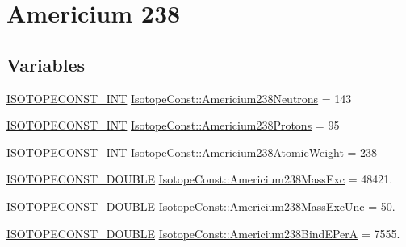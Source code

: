 \hypertarget{group___isotope_const-_americium-_am238}{}\section{Americium 238}
\label{group___isotope_const-_americium-_am238}
\subsection*{Variables}
\begin{DoxyCompactItemize}
\item 
\mbox{\hyperlink{group___isotope_const-_macros_ga5f18360b3e99483a35c32d789e62621c}{I\+S\+O\+T\+O\+P\+E\+C\+O\+N\+S\+T\+\_\+\+I\+NT}} \mbox{\hyperlink{group___isotope_const-_americium-_am238_gaca530676eab99aee4e47d8e9b5197b26}{Isotope\+Const\+::\+Americium238\+Neutrons}} = 143
\item 
\mbox{\hyperlink{group___isotope_const-_macros_ga5f18360b3e99483a35c32d789e62621c}{I\+S\+O\+T\+O\+P\+E\+C\+O\+N\+S\+T\+\_\+\+I\+NT}} \mbox{\hyperlink{group___isotope_const-_americium-_am238_ga6bbe7a3de3ba2c63cc3b370e14323937}{Isotope\+Const\+::\+Americium238\+Protons}} = 95
\item 
\mbox{\hyperlink{group___isotope_const-_macros_ga5f18360b3e99483a35c32d789e62621c}{I\+S\+O\+T\+O\+P\+E\+C\+O\+N\+S\+T\+\_\+\+I\+NT}} \mbox{\hyperlink{group___isotope_const-_americium-_am238_gaab8fb5bebdc0a9f78f2ca303e73b6611}{Isotope\+Const\+::\+Americium238\+Atomic\+Weight}} = 238
\item 
\mbox{\hyperlink{group___isotope_const-_macros_ga8f45a7272ce02c0b4c65c44636ed719a}{I\+S\+O\+T\+O\+P\+E\+C\+O\+N\+S\+T\+\_\+\+D\+O\+U\+B\+LE}} \mbox{\hyperlink{group___isotope_const-_americium-_am238_ga63723c4fe666709ea28e31e04482a9e4}{Isotope\+Const\+::\+Americium238\+Mass\+Exc}} = 48421.
\item 
\mbox{\hyperlink{group___isotope_const-_macros_ga8f45a7272ce02c0b4c65c44636ed719a}{I\+S\+O\+T\+O\+P\+E\+C\+O\+N\+S\+T\+\_\+\+D\+O\+U\+B\+LE}} \mbox{\hyperlink{group___isotope_const-_americium-_am238_gafe53cd3d992824c4e73017e701cb3ac7}{Isotope\+Const\+::\+Americium238\+Mass\+Exc\+Unc}} = 50.
\item 
\mbox{\hyperlink{group___isotope_const-_macros_ga8f45a7272ce02c0b4c65c44636ed719a}{I\+S\+O\+T\+O\+P\+E\+C\+O\+N\+S\+T\+\_\+\+D\+O\+U\+B\+LE}} \mbox{\hyperlink{group___isotope_const-_americium-_am238_ga358c585ec8cac2252417b10c9fec56bf}{Isotope\+Const\+::\+Americium238\+Bind\+E\+PerA}} = 7555.
\item 

\end{DoxyCompactItemize}
